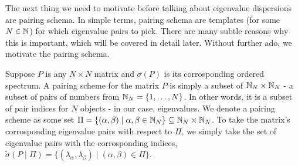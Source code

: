 
% 
% 
% 
% 



The next thing we need to motivate before talking about eigenvalue dispersions are pairing schema. In simple terms, pairing schema are templates (for some $N \in \mathbb{N}$) for which eigenvalue pairs to pick. There are many subtle reasons why this is important, which will be covered in detail later. Without further ado, we motivate the pairing schema. 

\begin{definition}
Suppose $P$ is any $N \times N$ matrix and $\sigma(P)$ is its corrosponding ordered spectrum. A pairing scheme for the matrix $P$ is simply a subset of $\mathbb{N}_N \times \mathbb{N}_N$ - a subset of pairs of numbers from $\mathbb{N}_N = \{1, \dots, N\}$. In other words, it is a subset of pair indices for $N$ objects - in our case, eigenvalues. We denote a pairing scheme as some set $\Pi = \{(\alpha, \beta) \mid \alpha, \beta \in \mathbb{N}_N\} \subseteq \mathbb{N}_N \times \mathbb{N}_N$. To take the matrix's corrosponding eigenvalue pairs with respect to $\Pi$, we simply take the set of eigenvalue pairs with the corrosponding indices, $\tilde{\sigma}(P \mid \Pi) = \{(\lambda_{\alpha},\lambda_{\beta}) \mid ({\alpha},{\beta}) \in \Pi\}$.
\end{definition}


